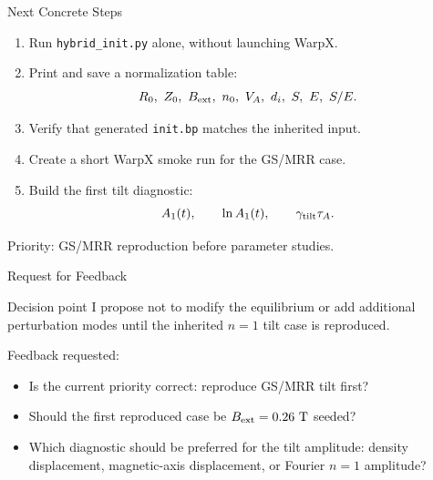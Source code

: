 \documentclass[10pt,aspectratio=169]{beamer}
\begin{document}
\begin{frame}{Next Concrete Steps}
    \begin{enumerate}
        \item Run \texttt{hybrid\_init.py} alone, without launching WarpX.
        \item Print and save a normalization table:
        \[
        R_0,\ Z_0,\ B_{\rm ext},\ n_0,\ V_A,\ d_i,\ S,\ E,\ S/E.
        \]
        \item Verify that generated \texttt{init.bp} matches the inherited input.
        \item Create a short WarpX smoke run for the GS/MRR case.
        \item Build the first tilt diagnostic:
        \[
        A_1(t),\qquad
        \ln A_1(t),\qquad
        \gamma_{\rm tilt}\tau_A.
        \]
    \end{enumerate}

    \vspace{0.25cm}

    \begin{center}
        \Large
        Priority: GS/MRR reproduction before parameter studies.
    \end{center}
\end{frame}

\begin{frame}{Request for Feedback}
    \begin{block}{Decision point}
        I propose not to modify the equilibrium or add additional perturbation
        modes until the inherited \(n=1\) tilt case is reproduced.
    \end{block}

    \vspace{0.3cm}

    Feedback requested:
    \begin{itemize}
        \item Is the current priority correct: reproduce GS/MRR tilt first?
        \item Should the first reproduced case be \(B_{\rm ext}=0.26~\mathrm{T}\)
        seeded?
        \item Which diagnostic should be preferred for the tilt amplitude:
        density displacement, magnetic-axis displacement, or Fourier \(n=1\)
        amplitude?
    \end{itemize}
\end{frame}

\end{document}
